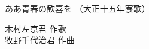 \documentclass[10pt,b5j]{tarticle} %
\begin{document}
\begin{minipage}[c]{0.7\hsize} %
    \begin{center}
        {\LARGE
            ああ青春の歓喜を %
        }
        {\small 
            （大正十五年寮歌） %
        }
    \end{center}
\end{minipage}
\begin{minipage}[c]{0.3\hsize} %
    \begin{flushright} %
        木村左京君 作歌\\牧野千代治君 作曲 %
    \end{flushright}
\end{minipage}
\end{document}
